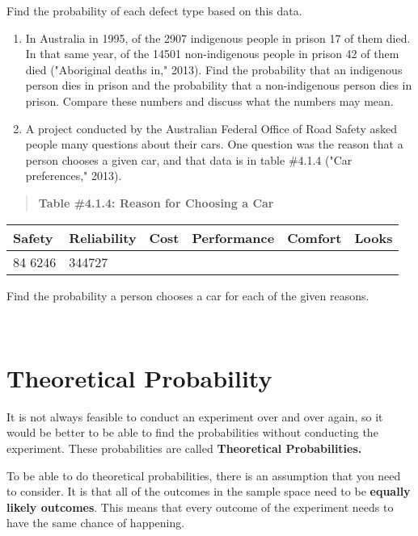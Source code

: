 \documentclass[]{book}
\begin{document}
Find the probability of each defect type based on this data.

\begin{enumerate}
\def\labelenumi{\arabic{enumi}.}
\setcounter{enumi}{2}
\item
  In Australia in 1995, of the 2907 indigenous people in prison 17 of
  them died. In that same year, of the 14501 non-indigenous people in
  prison 42 of them died ("Aboriginal deaths in," 2013). Find the
  probability that an indigenous person dies in prison and the
  probability that a non-indigenous person dies in prison. Compare
  these numbers and discuss what the numbers may mean.
\item
  A project conducted by the Australian Federal Office of Road Safety
  asked people many questions about their cars. One question was the
  reason that a person chooses a given car, and that data is in table
  \#4.1.4 ("Car preferences," 2013).
\end{enumerate}

\begin{quote}
\textbf{Table \#4.1.4: Reason for Choosing a Car}
\end{quote}

\begin{longtable}[]{@{}llllll@{}}
\toprule
Safety & Reliability & Cost & Performance & Comfort & Looks\tabularnewline
\midrule
\endhead
84 6246 & 344727 & & & &\tabularnewline
\bottomrule
\end{longtable}

Find the probability a person chooses a car for each of the given
reasons.

\textbf{\\
}

\hypertarget{theoretical-probability}{%
\section{Theoretical Probability}\label{theoretical-probability}}

It is not always feasible to conduct an experiment over and over again, so it would be better to be able to find the probabilities without conducting the experiment. These probabilities are called \textbf{Theoretical Probabilities.}

To be able to do theoretical probabilities, there is an assumption that you need to consider. It is that all of the outcomes in the sample space need to be \textbf{equally likely outcomes}. This means that every outcome of the experiment needs to have the same chance of happening.
\end{document}
